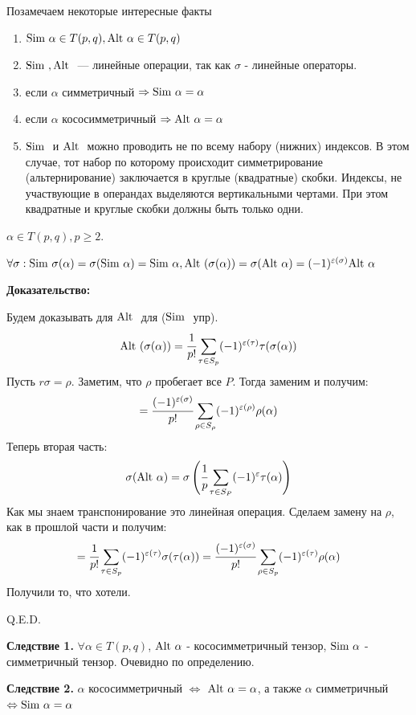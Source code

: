 Позамечаем некоторые интересные факты 
\begin{enumerate}
    \item $\text{Sim } \alpha \in T(p,q), \text{Alt } \alpha \in T(p,q) $ 
    \item $\text{Sim }, \text{Alt }$ --- линейные операции, так как $\sigma$ - линейные операторы.
    \item если $\alpha$ симметричный $\Rightarrow \text{Sim } \alpha = \alpha$
    \item  если $\alpha$ кососимметричный $\Rightarrow \text{Alt } \alpha = \alpha$
    \item $\text{Sim }$ и $\text{Alt }$ можно проводить не по всему набору (нижних) индексов. В этом случае, тот набор по которому происходит симметрирование (альтернирование) заключается в круглые (квадратные) скобки. Индексы, не участвующие в операндах выделяются вертикальными чертами. При этом квадратные и круглые скобки должны быть только одни.

\end{enumerate}


$\alpha \in T(p,q), p \geq 2.$ 

$\forall \sigma: \text{Sim } \sigma(\alpha) = \sigma(\text{Sim } \alpha) = \text{Sim } \alpha, \text{Alt }(\sigma(\alpha)) = \sigma(\text{Alt }\alpha) = (-1)^{\varepsilon(\sigma)}\text{Alt } \alpha$

\textbf{Доказательство:}

Будем доказывать для $\text{Alt }$ для ($\text{Sim }$ упр).
$$\text{Alt } (\sigma(\alpha))=\cfrac{1}{p!}\sum\limits_{\tau\in S_p}(-1)^{\varepsilon(\tau)}\tau(\sigma(\alpha))$$
Пусть $r \sigma = \rho$. Заметим, что $\rho$ пробегает все $P$. Тогда заменим и получим:
$$=  \cfrac{(-1)^{\varepsilon(\sigma)}}{p!}\sum\limits_{\rho \in S_\rho} (-1)^{\varepsilon(\rho)}\rho(\alpha)$$
Теперь вторая часть:
$$\sigma(\text{Alt } \alpha) = \sigma\left(\cfrac{1}{p}\sum_{\tau\in S_P}(-1)^{\varepsilon}\tau(\alpha)\right)$$
Как мы знаем транспонирование это линейная операция. Сделаем замену на $\rho$, как в прошлой части и получим:
$$= \cfrac{1}{p!}\sum\limits_{\tau \in S_p}(-1)^{\varepsilon(\tau)}\sigma(\tau(\alpha)) = \cfrac{(-1)^{\varepsilon(\sigma)}}{p!}\sum\limits_{\rho \in S_p}(-1)^{\varepsilon(\tau)} \rho(\alpha)$$
Получили то, что хотели.

\hfill Q.E.D.

\textbf{Следствие 1.} $\forall \alpha \in T(p,q)$, $\text{Alt } \alpha$ - кососимметричный тензор, $\text{Sim } \alpha$ - симметричный тензор. Очевидно по определению.

\textbf{Следствие 2.} $\alpha$ кососимметричный $\Leftrightarrow$ $\text{Alt } \alpha= \alpha$, а также $\alpha$ симметричный $\Leftrightarrow \text{Sim } \alpha = \alpha$

